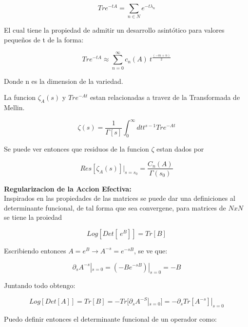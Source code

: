 \begin{equation}
Tr e ^{-t A} = 
\sum _{n  \in N} e ^{-t \lambda _{n} }
\end{equation}

El cual tiene la propiedad de admitir un desarrollo asintótico para valores pequeños de t de la forma:

\begin{equation}
Tr e ^{-t A} \approx 
\sum _{n=0} ^{\infty}
c _n (A) \ 
t ^{\frac{(-m+n)}{2}}
\end{equation}

Donde n es la dimension de la variedad.

La funcion $\zeta _A (s) $ y $Tr e ^{-A t}$ estan relacionadas a travez de la Transformada de Mellin.

\begin{equation}
\zeta (s) = \frac{1}{\Gamma [s] } 
\int _0 ^{\infty} dt
t ^{s-1} Tr e ^{-A t} 
\end{equation}

Se puede ver entonces que residuos de la funcion $\zeta$ estan dados por

\begin{equation}
Res[\zeta _A (s)] | _{s= s_0} = \frac{C _n (A)}{\Gamma (s _0)}
\end{equation}

\textbf{Regularizacion de la Accion Efectiva:} \\

Inspirados en las propiedades de las matrices se puede dar una definiciones al determinante funcional, de tal forma que sea convergene, para matrices de $ NxN$ se tiene la proiedad

\begin{equation}
Log [ Det \left[ \ e ^B \right] ] = Tr [B]
\end{equation}

Escribiendo entonces $A= e ^{B} \rightarrow A ^{-s} = e ^{-s B}$, se ve que:

\begin{equation}
\partial _s A ^{-s} | _{s=0} = (- B e ^{-s B}) | _{s=0} = - B
\end{equation}

Juntando todo obtengo:

\begin{equation}
Log [Det [A ]] = Tr[B] = - Tr [\partial _s A ^{-S} | _{s=0} ]= - \partial _s Tr[A ^{-s}] | _{s=0}
\end{equation}

Puedo definir entonces el determinante funcional de un operador como:

